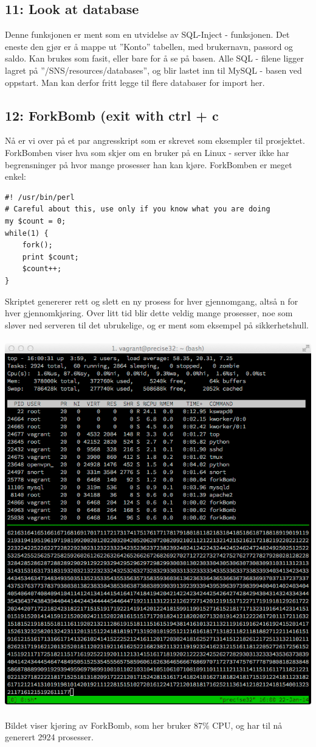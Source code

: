 \documentclass{article}
\begin{document}
\subsection{11: Look at database}
Denne funksjonen er ment som en utvidelse av SQL-Inject - funksjonen. Det eneste den gjør er å mappe ut ''Konto'' tabellen, med brukernavn, passord og saldo. Kan brukes som fasit, eller bare for å se på basen. Alle SQL - filene ligger lagret på ''/SNS/resources/databases'', og blir lastet inn til MySQL - basen ved oppstart. Man kan derfor fritt legge til flere databaser for import her.
\subsection{12: ForkBomb (exit with ctrl + c}
Nå er vi over på et par angresskript som er skrevet som eksempler til prosjektet. ForkBomben viser hva som skjer om en bruker på en Linux - server ikke har begrensninger på hvor mange prosesser han kan kjøre. ForkBomben er meget enkel: 
\begin{lstlisting}
#! /usr/bin/perl
# Careful about this, use only if you know what you are doing
my $count = 0;
while(1) {
    fork();
    print $count;
    $count++;
}
\end{lstlisting}
Skriptet genererer rett og slett en ny prosess for hver gjennomgang, altså n for hver gjennomkjøring. Over litt tid blir dette veldig mange prosesser, noe som sløver ned serveren til det ubrukelige, og er ment som eksempel på sikkerhetshull. 
\\
\\
\includegraphics[scale = 0.6]{pictures/forkbomb.png}
\\
\\
Bildet viser kjøring av ForkBomb, som her bruker 87\% CPU, og har til nå generert 2924 prosesser. 
\end{document}
